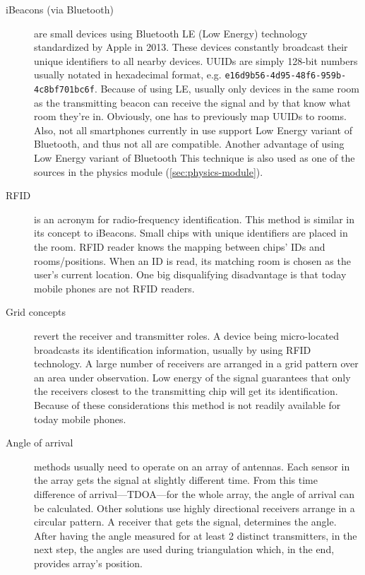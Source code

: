 \begin{description}
	\item[iBeacons (via Bluetooth)] are small devices using Bluetooth LE (Low Energy) technology standardized by Apple in 2013. These devices constantly broadcast their unique identifiers to all nearby devices. UUIDs are simply 128-bit numbers usually notated in hexadecimal format, e.g. \texttt{e16d9b56-4d95-48f6-959b-4c8bf701bc6f}. Because of using LE, usually only devices in the same room as the transmitting beacon can receive the signal and by that know what room they're in. Obviously, one has to previously map UUIDs to rooms. Also, not all smartphones currently in use support Low Energy variant of Bluetooth, and thus not all are compatible. Another advantage of using Low Energy variant of Bluetooth  This technique is also used as one of the sources in the physics module (\cref{sec:physics-module}).
	
	\item[RFID] is an acronym for radio-frequency identification. This method is similar in its concept to iBeacons.  Small chips with unique identifiers are placed in the room. RFID reader knows the mapping between chips' IDs and rooms/positions. When an ID is read, its matching room is chosen as the user's current location. One big disqualifying disadvantage is that today mobile phones are not RFID readers.
	
	\item[Grid concepts] revert the receiver and transmitter roles. A device being micro-located broadcasts its identification information, usually by using RFID technology. A large number of receivers are arranged in a grid pattern over an area under observation. Low energy of the signal guarantees that only the receivers closest to the transmitting chip will get its identification. Because of these considerations this method is not readily available for today mobile phones.
	
	\item[Angle of arrival] methods usually need to operate on an array of antennas. Each sensor in the array gets the signal at slightly different time. From this time difference of arrival---TDOA---for the whole array, the angle of arrival can be calculated. Other solutions use highly directional receivers arrange in a circular pattern. A receiver that gets the signal, determines the angle. After having the angle measured for at least 2 distinct transmitters, in the next step, the angles are used during  triangulation which, in the end, provides array's position.
	

\end{description}
